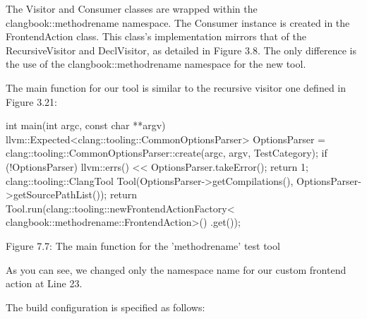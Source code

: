 The Visitor and Consumer classes are wrapped within the clangbook::methodrename namespace. The Consumer instance is created in the FrontendAction class. This class’s implementation mirrors that of the RecursiveVisitor and DeclVisitor, as detailed in Figure 3.8. The only difference is the use of the clangbook::methodrename namespace for the new tool.


The main function for our tool is similar to the recursive visitor one defined in Figure 3.21:

\begin{cpp}
int main(int argc, const char **argv) {
  llvm::Expected<clang::tooling::CommonOptionsParser> OptionsParser =
    clang::tooling::CommonOptionsParser::create(argc, argv, TestCategory);
  if (!OptionsParser) {
    llvm::errs() << OptionsParser.takeError();
    return 1;
  }
  clang::tooling::ClangTool Tool(OptionsParser->getCompilations(),
                                 OptionsParser->getSourcePathList());
   return Tool.run(clang::tooling::newFrontendActionFactory<
                   clangbook::methodrename::FrontendAction>()
                   .get());
}
\end{cpp}

\begin{center}
Figure 7.7: The main function for the ’methodrename’ test tool
\end{center}

As you can see, we changed only the namespace name for our custom frontend action at Line 23.

The build configuration is specified as follows:


